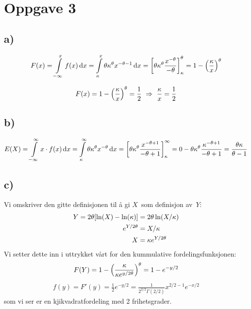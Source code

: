 \documentclass[12p,a4paper]{article}
\renewcommand{\exp}{e^}
\newcommand{\half}{\frac{1}{2}}
\renewcommand{\exp}{e^}
\begin{document}
\section*{Oppgave 3}
\subsection*{a)}
\begin{equation*}
    F(x) = \int\limits_{-\infty}^x f(x) \dd{x} = \int\limits_{\kappa}^x \theta\kappa^\theta x^{-\theta-1} \dd{x} = \qty[\theta\kappa^\theta\frac{x^{-\theta}}{-\theta}]_\kappa^\theta = 1 - \qty(\frac{\kappa}{x})^\theta
\end{equation*}

\begin{equation*}
    F(x) = 1 - \qty(\frac{\kappa}{x})^\theta = \half \ \Rightarrow \ \frac{\kappa}{x} = \frac{1}{2}
\end{equation*}


\subsection*{b)}
\begin{equation*}
    E(X) = \int\limits_{-\infty}^\infty x\cdot f(x) \dd{x}
         = \int\limits_{\kappa}^\infty \theta\kappa^\theta x^{-\theta} \dd{x}
         = \qty[ \theta\kappa^\theta \frac{x^{-\theta+1}}{-\theta+1} ]_{\kappa}^\infty 
         = 0 - \theta\kappa^\theta \frac{\kappa^{-\theta + 1}}{-\theta +1}
         = \frac{\theta\kappa}{\theta - 1}
\end{equation*}


\subsection*{c)}
Vi omskriver den gitte definisjonen til å gi $X$ som definisjon av $Y$:
\begin{align*}
    Y = 2\theta \qty[\ln(X) - \ln(\kappa)] &= 2\theta\ln(X/\kappa) \\
    \exp{Y/2\theta} &= X/\kappa \\
    X &= \kappa \exp{Y/2\theta}
\end{align*}
Vi setter dette inn i uttrykket vårt for den kummulative fordelingsfunksjonen:
\begin{align*}
    F(Y) = 1 - \qty(\frac{\kappa}{\kappa \exp{y/2\theta}})^\theta = 1 - \exp{-y/2}
\end{align*}
\begin{align*}
    f(y) = F'(y) = \half\exp{-y/2} = \frac{1}{2^{2/2}\Gamma(2/2)}x^{2/2-1}\exp{-x/2}
\end{align*}
som vi ser er en kjikvadratfordeling med 2 frihetsgrader.
\end{document}
